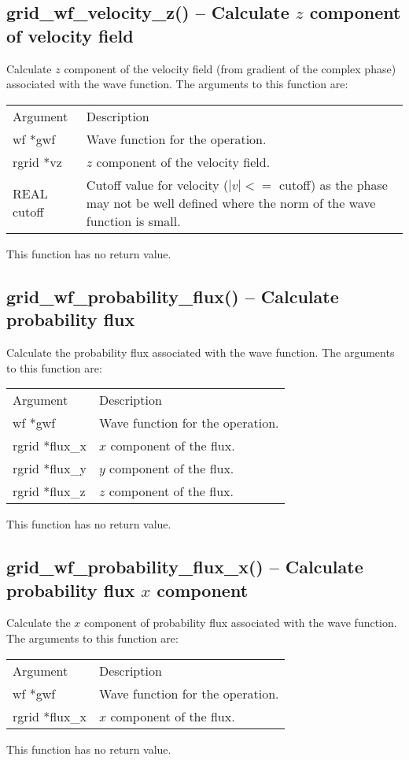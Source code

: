 \documentclass[12pt,letterpaper]{report}
\begin{document}
\subsection{grid\_wf\_velocity\_z() -- Calculate $z$ component of velocity field}

Calculate $z$ component of the velocity field (from gradient of the complex phase) associated with the wave function. The arguments to this function are:
\begin{longtable}{p{} p{}}
Argument & Description\\
\cline{1-2}
wf *gwf & Wave function for the operation.\\
rgrid *vz & $z$ component of the velocity field.\\
REAL cutoff & Cutoff value for velocity ($|v| <=$ cutoff) as the phase may not be well defined where the norm of the wave function is small.\\
\end{longtable}
\noindent
This function has no return value.

\subsection{grid\_wf\_probability\_flux() -- Calculate probability flux}

Calculate the probability flux associated with the wave function. The arguments to this function are:
\begin{longtable}{p{} p{}}
Argument & Description\\
\cline{1-2}
wf *gwf & Wave function for the operation.\\
rgrid *flux\_x & $x$ component of the flux.\\
rgrid *flux\_y & $y$ component of the flux.\\
rgrid *flux\_z & $z$ component of the flux.\\
\end{longtable}
\noindent
This function has no return value.

\subsection{grid\_wf\_probability\_flux\_x() -- Calculate probability flux $x$ component}

Calculate the $x$ component of probability flux associated with the wave function. The arguments to this function are:
\begin{longtable}{p{} p{}}
Argument & Description\\
\cline{1-2}
wf *gwf & Wave function for the operation.\\
rgrid *flux\_x & $x$ component of the flux.\\
\end{longtable}
\noindent
This function has no return value.
\end{document}
